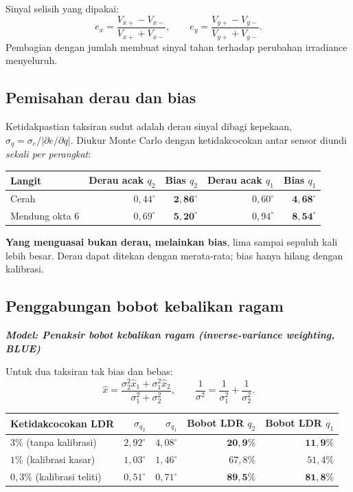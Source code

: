 \documentclass[11pt,a4paper]{article}
\newcommand{\degg}{^\circ}
\newcommand{\model}[1]{\textbf{\textit{Model: #1}}}
\begin{document}
Sinyal selisih yang dipakai:
\begin{equation}
e_x = \frac{V_{x+} - V_{x-}}{V_{x+} + V_{x-}}, \qquad
e_y = \frac{V_{y+} - V_{y-}}{V_{y+} + V_{y-}} .
\label{eq:ldr}
\end{equation}
Pembagian dengan jumlah membuat sinyal tahan terhadap perubahan irradiance menyeluruh.

\subsection{Pemisahan derau dan bias}

Ketidakpastian taksiran sudut adalah derau sinyal dibagi kepekaan, $\sigma_q = \sigma_e / |\partial e/\partial q|$.
Diukur Monte Carlo dengan ketidakcocokan antar sensor diundi \emph{sekali per perangkat}:

\begin{longtable}{l r r r r}
\toprule
\textbf{Langit} & \textbf{Derau acak $q_2$} & \textbf{Bias $q_2$} & \textbf{Derau acak $q_1$} & \textbf{Bias $q_1$} \\
\midrule
Cerah & $0{,}44\degg$ & $\bm{2{,}86\degg}$ & $0{,}60\degg$ & $\bm{4{,}68\degg}$ \\
Mendung okta 6 & $0{,}69\degg$ & $\bm{5{,}20\degg}$ & $0{,}94\degg$ & $\bm{8{,}54\degg}$ \\
\bottomrule
\end{longtable}

\textbf{Yang menguasai bukan derau, melainkan bias}, lima sampai sepuluh kali lebih besar. Derau dapat
ditekan dengan merata-rata; bias hanya hilang dengan kalibrasi.

\subsection{Penggabungan bobot kebalikan ragam}

\model{Penaksir bobot kebalikan ragam (inverse-variance weighting, BLUE)}

Untuk dua taksiran tak bias dan bebas:
\begin{equation}
\hat{x} = \frac{\sigma_2^2 \hat{x}_1 + \sigma_1^2 \hat{x}_2}{\sigma_1^2 + \sigma_2^2},
\qquad \frac{1}{\sigma^2} = \frac{1}{\sigma_1^2} + \frac{1}{\sigma_2^2}.
\end{equation}

\begin{longtable}{l r r r r}
\toprule
\textbf{Ketidakcocokan LDR} & $\sigma_{q_2}$ & $\sigma_{q_1}$ & \textbf{Bobot LDR $q_2$} & \textbf{Bobot LDR $q_1$} \\
\midrule
$3\%$ (tanpa kalibrasi) & $2{,}92\degg$ & $4{,}08\degg$ & $\bm{20{,}9\%}$ & $\bm{11{,}9\%}$ \\
$1\%$ (kalibrasi kasar) & $1{,}03\degg$ & $1{,}46\degg$ & $67{,}8\%$ & $51{,}4\%$ \\
$0{,}3\%$ (kalibrasi teliti) & $0{,}51\degg$ & $0{,}71\degg$ & $\bm{89{,}5\%}$ & $\bm{81{,}8\%}$ \\
\bottomrule
\end{longtable}
\end{document}
